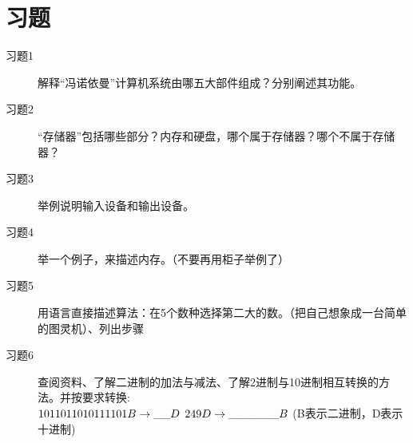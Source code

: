 \section{习题}
\begin{description}
	\item[习题1]解释“冯诺依曼”计算机系统由哪五大部件组成？分别阐述其功能。
	\item[习题2]“存储器”包括哪些部分？内存和硬盘，哪个属于存储器？哪个不属于存储器？
	\item[习题3]举例说明输入设备和输出设备。
	\item[习题4]举一个例子，来描述内存。（不要再用柜子举例了）
	\item[习题5]用语言直接描述算法：在5个数种选择第二大的数。（把自己想象成一台简单的图灵机）、列出步骤
	\item[习题6]查阅资料、了解二进制的加法与减法、了解2进制与10进制相互转换的方法。并按要求转换:\\
	$1011 0110 1011 1101 B \to \_\_D\\$
	$249 D \to \_\_\_\_\_\_B\\$
	(B表示二进制，D表示十进制)
\end{description}









